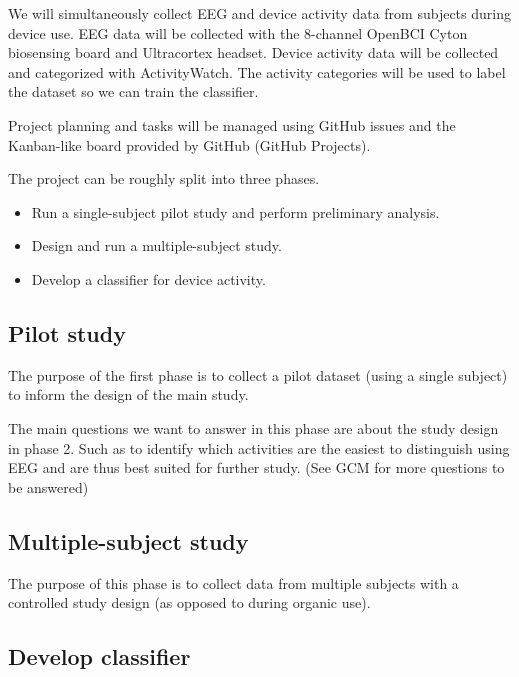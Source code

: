 \documentclass{IEEEtran}
\begin{document}
\begin{refsection}

We will simultaneously collect EEG and device activity data from subjects during device use. EEG data will be collected with the 8-channel OpenBCI Cyton biosensing board and Ultracortex headset. Device activity data will be collected and categorized with ActivityWatch. The activity categories will be used to label the dataset so we can train the classifier.

Project planning and tasks will be managed using GitHub issues and the Kanban-like board provided by GitHub (GitHub Projects).

The project can be roughly split into three phases.

\begin{itemize}
 \item Run a single-subject pilot study and perform preliminary analysis.
 \item Design and run a multiple-subject study.
 \item Develop a classifier for device activity.
\end{itemize}

\subsection{Pilot study}

The purpose of the first phase is to collect a pilot dataset (using a single subject) to inform the design of the main study.

The main questions we want to answer in this phase are about the study design in phase 2. Such as to identify which activities are the easiest to distinguish using EEG and are thus best suited for further study. (See GCM for more questions to be answered)

\subsection{Multiple-subject study}

The purpose of this phase is to collect data from multiple subjects with a controlled study design (as opposed to during organic use).

\subsection{Develop classifier}


\end{refsection}
\end{document}
